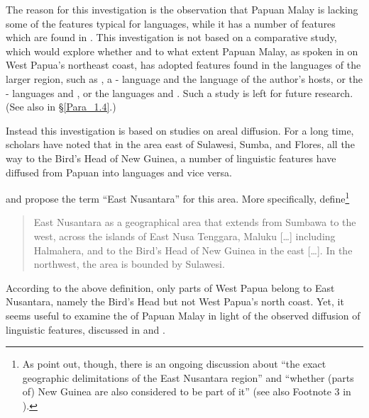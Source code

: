 The reason for this investigation is the observation that Papuan Malay is lacking some of the features typical for  languages, while it has a number of features which are found in . This investigation is not based on a comparative study, which would explore whether and to what extent Papuan Malay, as spoken in  on West Papua’s northeast coast, has adopted features found in the languages of the larger region, such as , a - language and the language of the author’s hosts, or the - languages  and , or the  languages  and . Such a study is left for future research. (See also  in §\ref{Para_1.4}.)



Instead this investigation is based on studies on areal diffusion. For a long time, scholars have noted that in the area east of Sulawesi, Sumba, and Flores, all the way to the Bird’s Head of New Guinea, a number of linguistic features have diffused from Papuan into  languages and vice versa.



{\citet{Klamer.2008}} and  \cite{Klamer.2010} propose the term  ``East Nusantara'' for this area. More specifically, \citet[1]{Klamer.2010} define\footnote{As \citet[1]{Klamer.2010} point out, though, there is an ongoing discussion about  ``the exact geographic delimitations of the East Nusantara region'' and  ``whether (parts of) New Guinea are also considered to be part of it'' (see also Footnote 3 in \citealt[1]{Klamer.2010}).}

\begin{quote}
East Nusantara as a geographical area that extends from Sumbawa to the west, across the islands of East Nusa Tenggara, Maluku [\ldots] including Halm\-ahera, and to the Bird’s Head of New Guinea in the east [\ldots]. In the northwest, the area is bounded by Sulawesi.
\end{quote}



According to the above definition, only parts of West Papua belong to East Nusantara, namely the Bird’s Head but not West Papua’s north coast. Yet, it seems useful to examine the  of Papuan Malay in light of the observed diffusion of linguistic features, discussed in \citet{Klamer.2008} and  \citet{Klamer.2010}.



